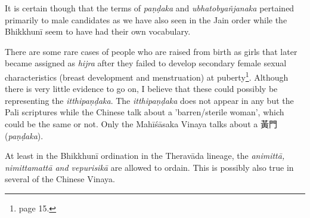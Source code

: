 It is certain though that the terms of {\em paṇḍaka} and {\em ubhatob­yañ­janaka} pertained primarily to male candidates as we have also seen in the Jain order while the Bhikkhunī seem to have had their own vocabulary.

There are some rare cases of people who are raised from birth as girls that later became assigned as {\em hijra} after they failed to develop secondary female sexual characteristics (breast development and menstruation) at puberty\footnote{\cite{nanda} page 15.}. Although there is very little evidence to go on, I believe that these could possibly be representing the {\em itthipaṇḍaka}. The {\em itthipaṇḍaka} does not appear in any but the Pali scriptures while the Chinese talk about a 'barren/sterile woman', which could be the same or not. Only the Mahīśāsaka Vinaya talks about a 黃門 ({\em paṇḍaka}). 

At least in the Bhikkhunī ordination in the Theravāda lineage, the {\em animittā, nimittamattā and vepurisikā} are allowed to ordain. This is possibly also true in several of the Chinese Vinaya.

